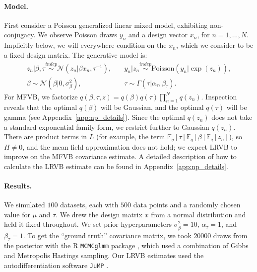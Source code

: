 \documentclass{article}\usepackage[]{graphicx}\usepackage[]{color}
\newcommand{\app}[1]{Appendix~\ref{app:#1}}
\newcommand{\gauss}{\mathcal{N}} %
\newcommand{\mbeq}{\mathbb{E}_{q}}
\newcommand{\indep}{\stackrel{indep}{\sim}}
\begin{document}
\paragraph{Model.}
First consider a Poisson generalized linear mixed model, exhibiting non-conjugacy.
We observe Poisson draws $y_n$ and a design vector $x_n$, for $n=1,...,N$.
Implicitly below, we will everywhere condition on the $x_n$, which
we consider to be a fixed design matrix.
The generative model is:
\begin{align}
  z_n \vert \beta, \tau \indep \gauss\left(z_n \vert \beta x_n, \tau^{-1}\right), &
  \quad
  y_n \vert z_n \indep \textrm{Poisson}\left(y_n \vert \exp(z_n)\right), \label{eq:pn_model}\\
  \beta \sim \gauss( \beta \vert 0, \sigma^2_\beta), &
  \quad
  \tau \sim \Gamma( \tau \vert \alpha_\tau, \beta_\tau).
  \nonumber
\end{align}
%
For MFVB, we factorize $q\left(\beta,\tau,z\right) =
q\left(\beta\right)q\left(\tau\right)\prod_{n=1}^{N}q\left(z_{n}\right)$.
Inspection reveals that the optimal $q\left(\beta\right)$ will be Gaussian, and
the optimal $q\left(\tau\right)$ will be gamma (see \app{np_details}). Since the
optimal $q\left(z_n\right)$ does not take a standard exponential family form, we
restrict further to Gaussian $q\left(z_{n}\right)$. There are product terms in
$L$ (for example, the term
$\mbeq\left[\tau\right]\mbeq\left[\beta\right]\mbeq\left[z_{n}\right]$), so
$H\ne0$, and the mean field approximation does not hold; we expect LRVB to
improve on the MFVB covariance estimate.  A detailed description of how to
calculate the LRVB estimate can be found in \app{np_details}.

\paragraph{Results.}




\newcommand{\pnn}{500}
\newcommand{\pnnsims}{100}
\newcommand{\pnmupriorvar}{10}
\newcommand{\pntaualpha}{1}
\newcommand{\pntaubeta}{1}
\newcommand{\pnmcmciters}{20000}


We simulated $\pnnsims$ datasets, each with $\pnn$ data points and a randomly
chosen value for $\mu$ and $\tau$.  We drew the design matrix $x$ from a normal
distribution and held it fixed throughout.  We set prior hyperparameters
$\sigma_\beta^{2} = \pnmupriorvar$, $\alpha_\tau = \pntaualpha$, and $\beta_\tau =
\pntaubeta$. To get the ``ground truth'' covariance matrix, we took
$\pnmcmciters$ draws from the posterior with the R \texttt{MCMCglmm} package
\citep{rpackage:MCMCglmm}, which used a combination of Gibbs and Metropolis
Hastings sampling.  Our LRVB estimates used the autodifferentiation software
\texttt{JuMP} \citep{JuMP:LubinDunningIJOC}.
\end{document}
